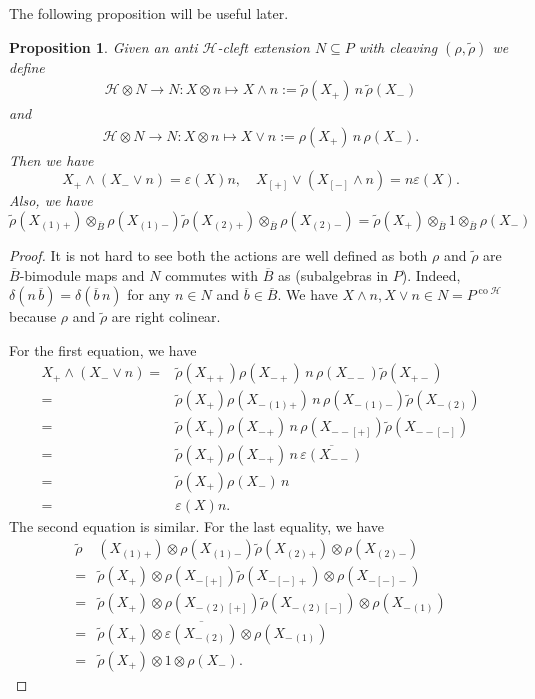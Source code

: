 \documentclass[a4paper,reqno]{amsart}
\numberwithin{equation}{section}
\theoremstyle{plain}
\newtheorem{prop}[thm]{Proposition}
\theoremstyle{remark}
\numberwithin{equation}{section}
\newcommand{\ot}{\otimes}
\newcommand{\BB}{\overline{B}}
\newcommand{\trho}{{\tilde{\rho}}}
\renewcommand{\o}{{}_{\scriptscriptstyle{(1)}}}
\renewcommand{\t}{{}_{\scriptscriptstyle{(2)}}}
\newcommand{\CH}{\mathcal{H}}
\newcommand\co{{\operatorname{co}}}
\begin{document}
The following proposition will be useful later.
\begin{prop}\label{prop. cleaving maps}
    Given an anti $\CH$-cleft extension $N\subseteq P$ with cleaving  $(\rho,\trho)$ we define 
    \begin{align*}
        \CH\ot N\to N: X\ot n\mapsto X\wedge n:=\trho(X_{+})\,n\,\trho(X_{-})
    \end{align*}
and
\begin{align*}
        \CH\ot N\to N: X\ot n\mapsto X\vee  n:=\rho(X_{+})\,n\,\rho(X_{-}).
    \end{align*}
    Then we have
    \[X_{+}\wedge(X_{-}\vee n)=\varepsilon(X)n,\quad X_{[+]}\vee(X_{[-]}\wedge n)=n\varepsilon(X).\]
Also, we have
\[\trho(X\o{}_{+})\ot_{\BB}\rho(X\o{}_{-})\trho(X\t{}_{+})\ot_{\BB}\rho(X\t{}_{-})=\trho(X{}_{+})\ot_{\BB}1\ot_{\BB}\rho(X{}_{-})\]
\end{prop}
\begin{proof}It is not hard to see both the actions are well defined as both $\rho$ and $\trho$ are $\BB$-bimodule maps and $N$ commutes with $\BB$ as (subalgebras in $P$). Indeed, $\delta(n\,\overline{b})=\delta(\overline{b}\,n)$ for any $n\in N$ and $\overline{b}\in\BB$. We have $X\wedge n,X\vee n\in N=P^{\co\CH}$ because $\rho$ and $\trho$ are right colinear.

    For the first equation, we have
    \begin{align*}
       X_{+}\wedge(X_{-}\vee n)
       =&\trho(X_{++})\rho(X_{-+})\,n\,\rho(X_{--})\trho(X_{+-})\\
       =&\trho(X_{+})\rho(X{}_{-}\o{}_{+})\,n\,\rho(X{}_{-}\o{}_{-})\trho(X_{-}\t)\\
       =&\trho(X_{+})\rho(X{}_{-}{}_{+})\,n\,\rho(X{}_{--[+]})\trho(X{}_{--[-]}) \\
       =&\trho(X_{+})\rho(X{}_{-}{}_{+})\,n\,\overline{\varepsilon(X{}_{--})}\\
       =&\trho(X_{+})\rho(X{}_{-})\,n\\
       =&\varepsilon(X)n.
    \end{align*}
    The second equation is similar. For the last equality, we have
      \begin{align*}
        \trho&(X\o{}_{+})\ot\rho(X\o{}_{-})\trho(X\t{}_{+})\ot\rho(X\t{}_{-})\\
        =&\trho(X{}_{+})\ot\rho(X{}_{-[+]})\trho(X{}_{-[-]+})\ot\rho(X{}_{-[-]-})\\
        =&\trho(X{}_{+})\ot\rho(X{}_{-}\t{}_{[+]})\trho(X{}_{-}\t{}_{[-]})\ot\rho(X{}_{-}\o)\\
        =&\trho(X{}_{+})\ot\overline{\varepsilon(X_{-}\t)}\ot\rho(X{}_{-}\o)\\
        =&\trho(X{}_{+})\ot 1\ot\rho(X{}_{-}).
    \end{align*}
\end{proof}
\end{document}
